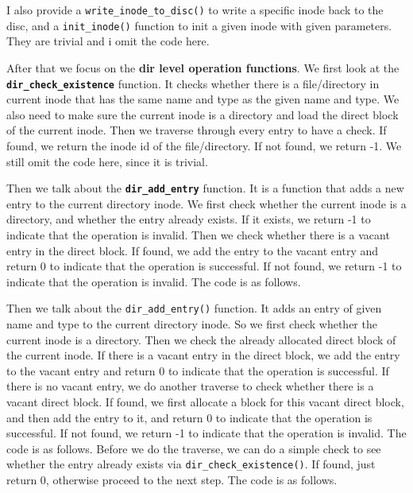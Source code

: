 I also provide a \texttt{write_inode_to_disc()} to write a specific inode back to the disc, and a \texttt{init_inode()}
 function to init a given inode with given parameters. They are trivial and i omit the code here.


After that we focus on the \textbf{dir level operation functions}. We first look at the \textbf{\texttt{dir_check_existence}} function. 
It checks whether there is a file/directory in current inode that has the same name and type as the given name and type. We also need to make 
sure the current inode is a directory and load the direct block of the current inode. Then we traverse through every entry to have a check. If found, we return the inode id of the file/directory. If not found, we return -1. 
We still omit the code here, since it is trivial.

Then we talk about the \textbf{\texttt{dir_add_entry}} function. It is a function that adds a new entry to the current directory inode. We first check whether the current inode is a directory, and whether the entry already exists. If it exists, we return -1 to indicate that the operation is invalid. 
Then we check whether there is a vacant entry in the direct block. If found, we add the entry to the vacant entry and return 0 to indicate that the operation is successful. If not found, we return -1 to indicate that the operation is invalid. The code is as follows.

Then we talk about the \texttt{dir_add_entry()} function. It adds an entry of given name and type to the current directory inode.
So we first check whether the current inode is a directory. Then we check the already allocated direct block of the current inode. If there is a vacant entry in the direct block, we add the entry to the vacant entry and return 0 to indicate that the operation is successful. 
If there is no vacant entry, we do another traverse to check whether there is a vacant direct block. If found, we first allocate a block for this vacant direct block, and then add the entry to it, and return 0 to indicate that the operation is successful. If not found, we return -1 to indicate that the operation is invalid. The code is as follows.
Before we do the traverse, we can do a simple check to see whether the entry already exists via \texttt{dir\_check\_existence()}. If found, just return 0, otherwise proceed to the next step. 
The code is as follows.

